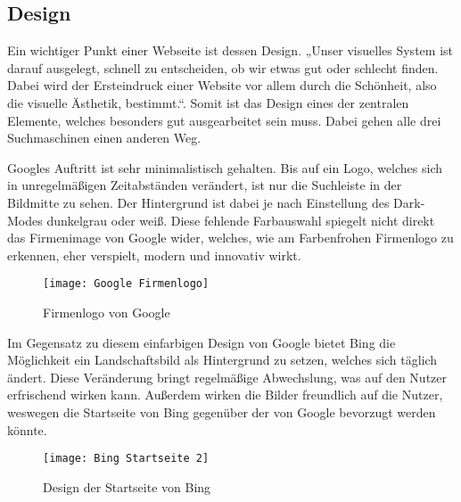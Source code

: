 \subsection{Design}
Ein wichtiger Punkt einer Webseite ist dessen Design. „Unser visuelles System ist darauf ausgelegt, schnell zu entscheiden,
ob wir etwas gut oder schlecht finden. Dabei wird der Ersteindruck einer Website vor allem durch die Schönheit, also die
visuelle Ästhetik, bestimmt.“\autocite[Seite 43]{Thielsch.}.
Somit ist das Design eines der zentralen Elemente, welches besonders gut ausgearbeitet sein muss.
Dabei gehen alle drei Suchmaschinen einen anderen Weg.

Googles Auftritt ist sehr minimalistisch gehalten. Bis auf ein Logo, welches sich in unregelmäßigen Zeitabständen verändert,
ist nur die Suchleiste in der Bildmitte zu sehen. Der Hintergrund ist dabei je nach Einstellung des Dark-Modes dunkelgrau
oder weiß. Diese fehlende Farbauswahl spiegelt nicht direkt das Firmenimage von Google wider, welches, wie am Farbenfrohen
Firmenlogo zu erkennen, eher verspielt, modern und innovativ wirkt.
\begin{figure}[h]
    \centering
    \texttt{[image: Google Firmenlogo]}
    \caption{Firmenlogo von Google\autocite{.2020}}
\end{figure}

Im Gegensatz zu diesem einfarbigen Design von Google bietet Bing die Möglichkeit ein Landschaftsbild als Hintergrund zu
setzen, welches sich täglich ändert. Diese Veränderung bringt regelmäßige Abwechslung, was auf den Nutzer erfrischend wirken
kann. Außerdem wirken die Bilder freundlich auf die Nutzer, weswegen die Startseite von Bing gegenüber der von Google
bevorzugt werden könnte.
\begin{figure}[h]
    \centering
    \texttt{[image: Bing Startseite 2]}
    \caption{Design der Startseite von Bing}
\end{figure}


